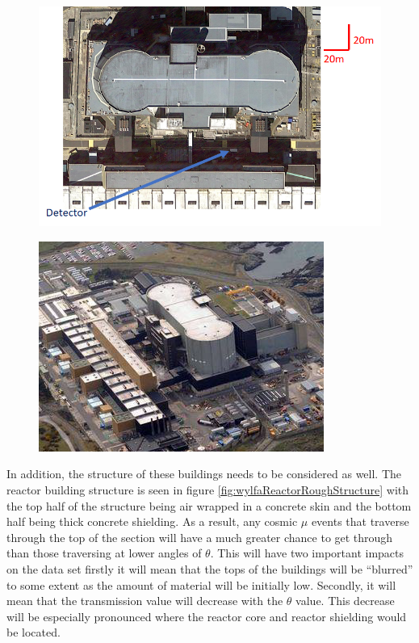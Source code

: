 \begin{figure}[htbp]
 \centering
 \includegraphics[width=0.75\linewidth]{Chapter5/Figs/wylfaRasterNew/DetectorPositionTopDown.png}
 \label{fig:DetectorPositionTopDown}
\end{figure}

\begin{figure}[htbp]
 \centering
 \includegraphics[width=0.6\linewidth]{Chapter5/Figs/Raster/wylfaArielView.png}
 \label{fig:wylfaAir}
\end{figure}

In addition, the structure of these buildings needs to be considered as well. The reactor building structure is seen in figure \ref{fig:wylfaReactorRoughStructure} with the top half of the structure being air wrapped in a concrete skin and the bottom half being thick concrete shielding. As a result, any cosmic $\mu$ events that traverse through the top of the section will have a much greater chance to get through than those traversing at lower angles of $\theta$. This will have two important impacts on the data set firstly it will mean that the tops of the buildings will be ``blurred'' to some extent as the amount of material will be initially low. Secondly, it will mean that the transmission value will decrease with the $\theta$ value. This decrease will be especially pronounced where the reactor core and reactor shielding would be located. 

